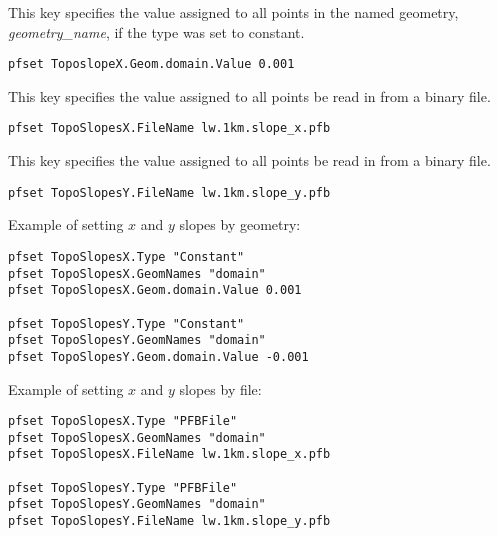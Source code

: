 {
This key specifies the value assigned to all points in the named
geometry, {\em geometry\_name}, if the type was set to constant.
}
\begin{display}\begin{verbatim}
pfset ToposlopeX.Geom.domain.Value 0.001
\end{verbatim}\end{display}

{
This key specifies the value assigned to all points be read in from a \parflow{} binary file.
}
\begin{display}\begin{verbatim}
pfset TopoSlopesX.FileName lw.1km.slope_x.pfb
\end{verbatim}\end{display}

{
This key specifies the value assigned to all points be read in from a \parflow{} binary file.
}
\begin{display}\begin{verbatim}
pfset TopoSlopesY.FileName lw.1km.slope_y.pfb
\end{verbatim}\end{display}

Example of setting $x$ and $y$ slopes by geometry:
\begin{display}\begin{verbatim}
pfset TopoSlopesX.Type "Constant"
pfset TopoSlopesX.GeomNames "domain"
pfset TopoSlopesX.Geom.domain.Value 0.001

pfset TopoSlopesY.Type "Constant"
pfset TopoSlopesY.GeomNames "domain"
pfset TopoSlopesY.Geom.domain.Value -0.001
\end{verbatim}\end{display}

Example of setting $x$ and $y$ slopes by file:
\begin{display}\begin{verbatim}
pfset TopoSlopesX.Type "PFBFile"
pfset TopoSlopesX.GeomNames "domain"
pfset TopoSlopesX.FileName lw.1km.slope_x.pfb

pfset TopoSlopesY.Type "PFBFile"
pfset TopoSlopesY.GeomNames "domain"
pfset TopoSlopesY.FileName lw.1km.slope_y.pfb
\end{verbatim}\end{display}



